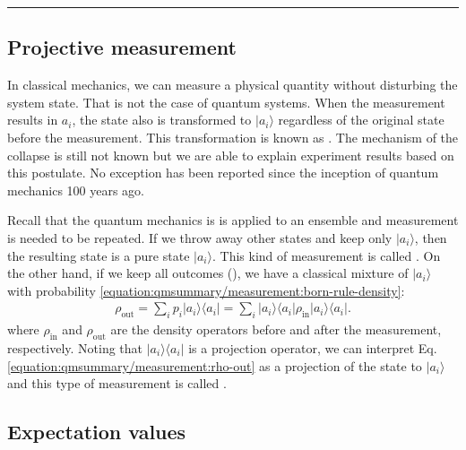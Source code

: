 \documentclass[letterpaper,10pt,english]{jupyterBook}
\begin{document}
\bigskip\hrule\bigskip



\subsection{Projective measurement}
\label{\detokenize{qmsummary/measurement:projective-measurement}}
\sphinxAtStartPar
In classical mechanics, we can measure a physical quantity without disturbing the system state.  That is not the case of quantum systems.  When  the measurement results in \(a_i\), the state also is transformed to \(|a_i\rangle\) regardless of the original state before the measurement.  This transformation is known as .  The mechanism of the collapse is still not known but we are able to explain experiment results based on this postulate.  No exception has been reported since the inception of quantum mechanics 100 years ago.

\sphinxAtStartPar
Recall that the quantum mechanics is is applied to an ensemble and measurement is needed to be repeated.  If we throw away other states and keep only \(|a_i\rangle\), then the resulting state is a pure state \(|a_i\rangle\).  This kind of measurement is called .   On the other hand, if we keep all outcomes (), we have a classical mixture of \(|a_i\rangle\) with probability \eqref{equation:qmsummary/measurement:born-rule-density}:
\begin{equation}\label{equation:qmsummary/measurement:rho-out}
\begin{split}
\rho_\text{out} = \sum_i p_i |a_i\rangle\langle a_i|  = \sum_i |a_i\rangle\langle a_i| \rho_\text{in} |a_i\rangle\langle a_i|.
\end{split}
\end{equation}
\sphinxAtStartPar
where \(\rho_\text{in}\) and \(\rho_\text{out}\) are the density operators before and after the measurement, respectively.   Noting that \(|a_i\rangle\langle a_i|\) is a projection operator, we can interpret Eq. \eqref{equation:qmsummary/measurement:rho-out} as a projection of the state to \(|a_i\rangle\) and this type of measurement is called .


\subsection{Expectation values}
\label{\detokenize{qmsummary/measurement:expectation-values}}
\end{document}
